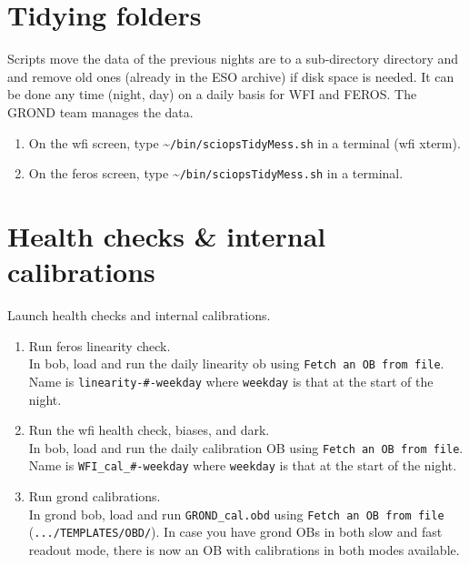 \documentclass[11pt,fleqn,a4paper]{book}
\begin{document}
\section{Tidying folders}

Scripts move the data of the previous nights are to a sub-directory directory and and remove old ones (already in the ESO archive) if disk space is needed.  It can be done any time (night, day) on a daily basis for WFI and FEROS.  The GROND team manages the data.

\begin{enumerate}
  \item On the \gls{wfi} screen, type \~{}\texttt{/bin/sciopsTidyMess.sh} in a terminal (wfi xterm).
  \item On the \gls{feros} screen, type \~{}\texttt{/bin/sciopsTidyMess.sh} in a terminal.
\end{enumerate}

\section{Health checks \& internal calibrations}
\label{sec:clocal}

Launch health checks and internal calibrations.

\begin{enumerate}
  \item Run \gls{feros} linearity check.\\
        In \gls{bob}, load and run the daily linearity \gls{ob} using \texttt{Fetch an OB from file}.\\
        Name is \texttt{linearity-\#-weekday} where \texttt{weekday} is that at the start of the night.
  \item Run the \gls{wfi} health check, biases, and dark.\\
        In \gls{bob}, load and run the daily calibration OB using \texttt{Fetch an OB from file}.\\
        Name is \texttt{WFI\_cal\_\#-weekday} where \texttt{weekday} is that at the start of the night.
  \item Run \gls{grond} calibrations.\\
        In \gls{grond} \gls{bob}, load and run \texttt{GROND\_cal.obd} using \texttt{Fetch an OB from file}\\ 
        (\texttt{.../TEMPLATES/OBD/}). In case you have \gls{grond} OBs in both slow and fast readout mode, there is now an OB with calibrations in both modes available. 
\end{enumerate}
\end{document}
